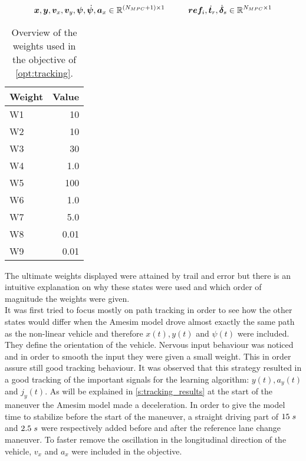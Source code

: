 \[\bm{x},\bm{y},\bm{v}_x,\bm{v}_y,\bm{\psi},\dot{\bm{\psi}},\bm{a}_x \in \mathbb{R}^{(N_{MPC}+1)\times1} \hspace{10mm}\bm{ref}_{i},\dot{\bm{t}}_r,\dot{\bm{\delta}}_s \in \mathbb{R}^{N_{MPC}\times1}\]


\begin{table}[h!]
	\centering
	\begin{tabular}{@{}lr@{}} 
		Weight    & Value\\ \midrule
		W1      & 10\\
		W2          & 10\\
		W3 	   & 30\\
		W4       & 1.0\\
		W5       & 100\\
		W6       & 1.0\\
		W7       & 5.0\\
		W8       & 0.01\\
		W9  & 0.01\\ \bottomrule
	\end{tabular}
	\caption{Overview of the weights used in the objective of \ref{opt:tracking}.}
	\label{tab:weights}
\end{table}

The ultimate weights displayed were attained by trail and error but there is an intuitive explanation on why these states were used and which order of magnitude the weights were given.\\
It was first tried to focus mostly on path tracking in order to see how the other states would differ when the Amesim model drove almost exactly the same path as the non-linear vehicle and therefore $x(t),y(t)$ and $\psi(t)$ were included. They define the orientation of the vehicle. Nervous input behaviour was noticed and in order to smooth the input they were given a small weight. This in order assure still good tracking behaviour. It was observed that this strategy resulted in a good tracking of the important signals for the learning algorithm: $y(t), a_y(t)$ and $j_y(t)$. As will be explained in \ref{s:tracking_results} at the start of the maneuver the Amesim model made a deceleration. In order to  give the model time to stabilize before the start of the maneuver, a straight driving part of $15\hspace{1mm}s$ and $2.5\hspace{1mm}s$ were respectively added before and after the reference lane change maneuver. To faster remove the oscillation in the longitudinal direction of the vehicle, $v_x$ and $a_x$ were included in the objective.\\

